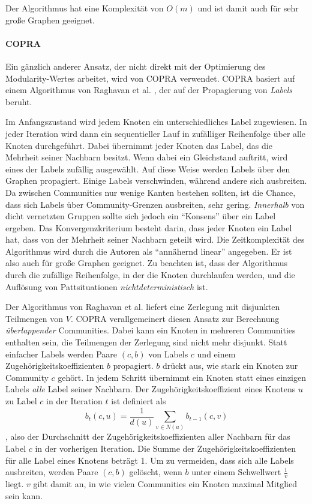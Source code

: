 Der Algorithmus hat eine Komplexität von $O(m)$ und ist damit auch
für sehr große Graphen geeignet.

\paragraph{COPRA}
\label{sec:copra}

Ein gänzlich anderer Ansatz, der nicht direkt mit der Optimierung
des Modularity-Wertes arbeitet, wird von COPRA \cite{Gregory2010}
verwendet. COPRA basiert auf einem Algorithmus von Raghavan et
al. \cite{Raghavan2007}, der auf der Propagierung von \emph{Labels}
beruht. 

Im Anfangszustand wird jedem Knoten ein unterschiedliches Label
zugewiesen. In jeder Iteration wird dann ein sequentieller Lauf in
zufälliger Reihenfolge über alle Knoten durchgeführt. Dabei
übernimmt jeder Knoten das Label, das die Mehrheit seiner Nachbarn
besitzt. Wenn dabei ein Gleichstand auftritt, wird eines der Labels
zufällig ausgewählt. Auf diese Weise werden Labels über den
Graphen propagiert. Einige Labels verschwinden, während andere sich
ausbreiten. Da zwischen Communities nur wenige Kanten bestehen
sollten, ist die Chance, dass sich Labels über Community-Grenzen
ausbreiten, sehr gering. \emph{Innerhalb} von dicht vernetzten Gruppen
sollte sich jedoch ein ``Konsens'' über ein Label ergeben. Das
Konvergenzkriterium besteht darin, dass jeder Knoten ein Label hat,
dass von der Mehrheit seiner Nachbarn geteilt wird. Die
Zeitkomplexität des Algorithmus wird durch die Autoren als
``annähernd linear'' angegeben. Er ist also auch für große
Graphen geeignet. Zu beachten ist, dass der Algorithmus durch die
zufällige Reihenfolge, in der die Knoten durchlaufen werden, und die
Auflösung von Pattsituationen \emph{nichtdeterministisch} ist.

Der Algorithmus von Raghavan et al. liefert eine Zerlegung mit
disjunkten Teilmengen von $V$. COPRA verallgemeinert diesen Ansatz zur
Berechnung \emph{überlappender} Communities. Dabei kann ein Knoten
in mehreren Communities enthalten sein, die Teilmengen der Zerlegung
sind nicht mehr disjunkt. Statt einfacher Labels werden Paare $(c, b)$
von Labels $c$ und einem Zugehörigkeitskoeffizienten $b$
propagiert. $b$ drückt aus, wie stark ein Knoten zur Community $c$
gehört. In jedem Schritt übernimmt ein Knoten statt eines einzigen
Labels \emph{alle} Label seiner Nachbarn. Der
Zugehörigkeitskoeffizient eines Knotens $u$ zu Label $c$ in der
Iteration $t$ ist definiert als
\begin{equation}
  \label{eq:10}
  b_t(c, u) = \frac{1}{d(u)}\sum_{v \in N(u)}b_{t-1}(c, v)
\end{equation}
, also der Durchschnitt der Zugehörigkeitskoeffizienten aller
Nachbarn für das Label $c$ in der vorherigen Iteration. Die Summe
der Zugehörigkeitskoeffizienten für alle Label eines Knotens
beträgt 1. Um zu vermeiden, dass sich alle Labels ausbreiten, werden
Paare $(c, b)$ gelöscht, wenn $b$ unter einem Schwellwert
$\frac{1}{v}$ liegt. $v$ gibt damit an, in wie vielen Communities ein
Knoten maximal Mitglied sein kann. 

